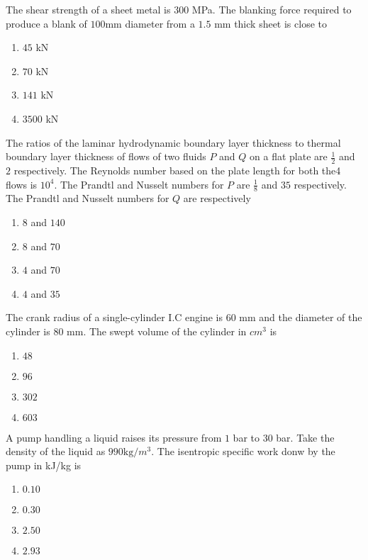 \item The shear strength of a sheet metal is $300$ MPa. The blanking force required to produce a blank of $100$mm diameter from a $1.5$ mm thick sheet is close to
\hfill{}
\begin{enumerate}
\item $45$ kN
\item $70$ kN
\item $141$ kN
\item $3500$ kN
\end{enumerate}

\item The ratios of the laminar hydrodynamic boundary layer thickness to thermal boundary layer thickness of flows of two fluids $P$ and $Q$ on a flat plate are $\frac{1}{2}$ and $2$ respectively. The Reynolds number based on the plate length for both the4 flows is $10^4$. The Prandtl and Nusselt numbers for $P$ are $\frac{1}{8}$ and $35$ respectively. The Prandtl and Nusselt numbers for $Q$ are respectively
\hfill{}
\begin{enumerate}
\item $8$ and $140$
\item $8$ and $70$
\item $4$ and $70$
\item $4$ and $35$
\end{enumerate}

\item The crank radius of a single-cylinder I.C engine is $60$ mm and the diameter of the cylinder is $80$ mm. The swept volume of the cylinder in ${cm}^3$ is
\hfill{}
\begin{enumerate}
\item $48$
\item $96$
\item $302$
\item $603$
\end{enumerate}

\item A pump handling a liquid raises its pressure from $1$ bar to $30$ bar. Take the density of the liquid as $990 \text{kg}/{m}^3$. The isentropic specific work donw by the pump in kJ/kg is
\hfill{}
\begin{enumerate}
\item $0.10$
\item $0.30$
\item $2.50$
\item $2.93$
\end{enumerate}

